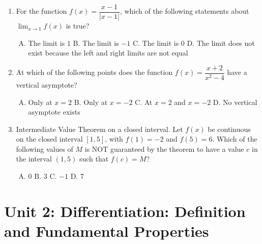\documentclass[11pt,a4paper]{article}
\begin{document}
\begin{enumerate}[1.]
    \item For the function $f(x) = \dfrac{x-1}{|x-1|}$, which of the following statements about $\displaystyle \lim_{x \to 1} f(x)$ is true?
    \begin{enumerate}[A.]
        \item The limit is $1$ \qquad B. The limit is $-1$ \qquad C. The limit is $0$ \qquad D. The limit does not exist because the left and right limits are not equal
    \end{enumerate}

    \item At which of the following points does the function $f(x) = \dfrac{x+2}{x^2 - 4}$ have a vertical asymptote?
    \begin{enumerate}[A.]
        \item Only at $x = 2$ \qquad B. Only at $x = -2$ \qquad C. At $x = 2$ and $x = -2$ \qquad D. No vertical asymptote exists
    \end{enumerate}

    \item Intermediate Value Theorem on a closed interval. Let $f(x)$ be continuous on the closed interval $[1, 5]$, with $f(1) = -2$ and $f(5) = 6$. Which of the following values of $M$ is NOT guaranteed by the theorem to have a value $c$ in the interval $(1, 5)$ such that $f(c) = M$?
    \begin{enumerate}[A.]
        \item $0$ \qquad B. $3$ \qquad C. $-1$ \qquad D. $7$
    \end{enumerate}
\end{enumerate}

\section*{Unit 2: Differentiation: Definition and Fundamental Properties}
\end{document}
